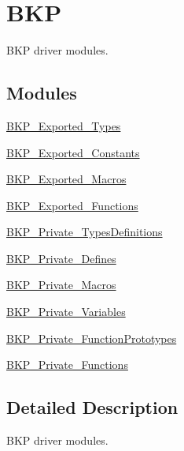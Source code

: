 \hypertarget{group___b_k_p}{}\section{B\+KP}
\label{group___b_k_p}


B\+KP driver modules.  


\subsection*{Modules}
\begin{DoxyCompactItemize}
\item 
\mbox{\hyperlink{group___b_k_p___exported___types}{B\+K\+P\+\_\+\+Exported\+\_\+\+Types}}
\item 
\mbox{\hyperlink{group___b_k_p___exported___constants}{B\+K\+P\+\_\+\+Exported\+\_\+\+Constants}}
\item 
\mbox{\hyperlink{group___b_k_p___exported___macros}{B\+K\+P\+\_\+\+Exported\+\_\+\+Macros}}
\item 
\mbox{\hyperlink{group___b_k_p___exported___functions}{B\+K\+P\+\_\+\+Exported\+\_\+\+Functions}}
\item 
\mbox{\hyperlink{group___b_k_p___private___types_definitions}{B\+K\+P\+\_\+\+Private\+\_\+\+Types\+Definitions}}
\item 
\mbox{\hyperlink{group___b_k_p___private___defines}{B\+K\+P\+\_\+\+Private\+\_\+\+Defines}}
\item 
\mbox{\hyperlink{group___b_k_p___private___macros}{B\+K\+P\+\_\+\+Private\+\_\+\+Macros}}
\item 
\mbox{\hyperlink{group___b_k_p___private___variables}{B\+K\+P\+\_\+\+Private\+\_\+\+Variables}}
\item 
\mbox{\hyperlink{group___b_k_p___private___function_prototypes}{B\+K\+P\+\_\+\+Private\+\_\+\+Function\+Prototypes}}
\item 
\mbox{\hyperlink{group___b_k_p___private___functions}{B\+K\+P\+\_\+\+Private\+\_\+\+Functions}}
\end{DoxyCompactItemize}


\subsection{Detailed Description}
B\+KP driver modules. 

